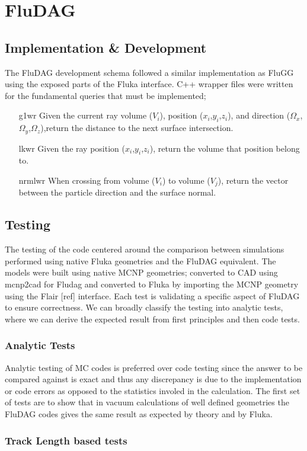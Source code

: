 \documentclass{anstrans}
\begin{document}
\section{FluDAG}
\subsection{Implementation \& Development}
The FluDAG development schema followed a similar implementation as FluGG using the exposed parts of the Fluka interface. C++ wrapper files were written for the fundamental queries that must be implemented;
\begin{itemize}
\item[g1wr]{Given the current ray volume ($V_i$), position ($x_i$,$y_i$,$z_i$), and direction ($\Omega_x$,$\Omega_y$,$\Omega_z$),return the distance to the next surface intersection.}
\item[lkwr]{Given the ray position ($x_i$,$y_i$,$z_i$), return the volume that position belong to.}	
\item[nrmlwr]{When crossing from volume ($V_i$) to volume ($V_j$), return
the vector between the particle direction and the surface normal.}
\end{itemize}
\subsection{Testing}
The testing of the code centered around the comparison between simulations performed using native Fluka geometries and the FluDAG equivalent. The models were built using native MCNP geometries; converted to CAD using mcnp2cad for Fludag and converted to Fluka by importing the MCNP geometry using the Flair [ref] interface. Each test is validating a specific aspect of FluDAG to ensure correctness. We can broadly classify the testing into analytic tests, where we can derive the expected result from first principles and then code tests.
\subsubsection{Analytic Tests}
Analytic testing of MC codes is preferred over code testing since the answer to be compared against is exact and thus any discrepancy is due to the implementation or code errors as opposed to the statistics involed in the calculation. The first set of tests are to show that in vacuum calculations of well defined geometries the FluDAG codes gives the same result as expected by theory and by Fluka.
\subsubsection*{Track Length based tests}
\end{document}
